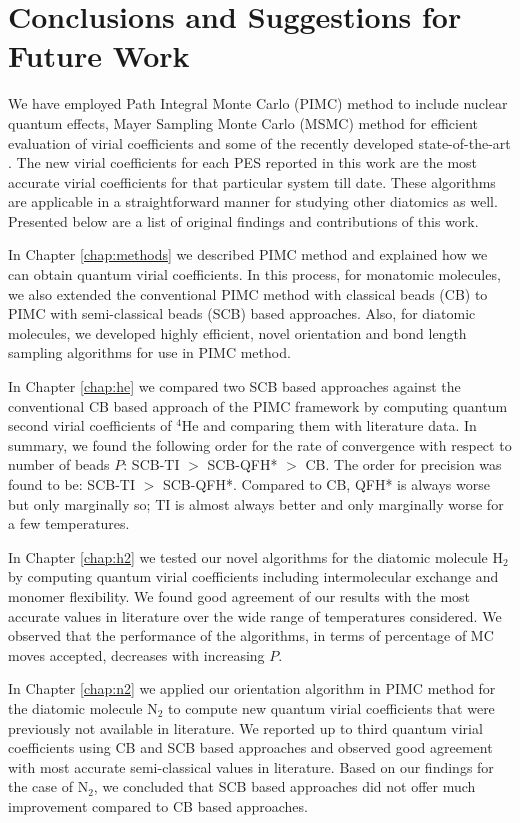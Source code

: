 \chapter{Conclusions and Suggestions for Future Work}
    We have employed Path Integral Monte Carlo (PIMC) method to include nuclear quantum effects, Mayer Sampling Monte Carlo (MSMC) \cite{Singh2004} method for efficient evaluation of virial coefficients and some of the recently developed state-of-the-art \abinitio{} \PESs{}. The new virial coefficients for each \abinitio{} PES reported in this work are the most accurate virial coefficients for that particular system till date. These algorithms are applicable in a straightforward manner for studying other diatomics as well. Presented below are a list of original findings and contributions of this work.

    In Chapter \ref{chap:methods} we described PIMC method and explained how we can obtain quantum virial coefficients. In this process, for monatomic molecules, we also extended the conventional PIMC method with classical beads (CB) to PIMC with semi-classical beads (SCB) based approaches. Also, for diatomic molecules, we developed highly efficient, novel orientation and bond length sampling algorithms for use in PIMC method.

    In Chapter \ref{chap:he} we compared two SCB based approaches against the conventional CB based approach of the PIMC framework by computing quantum second virial coefficients of $^4$He and comparing them with literature data. In summary, we found the following order for the rate of convergence with respect to number of beads $P$: SCB-TI $>$ SCB-QFH* $>$ CB. The order for precision was found to be: SCB-TI $>$ SCB-QFH*. Compared to CB, QFH* is always worse but only marginally so; TI is almost always better and only marginally worse for a few temperatures.

    In Chapter \ref{chap:h2} we tested our novel algorithms for the diatomic molecule H$_2$ by computing quantum virial coefficients including intermolecular exchange and monomer flexibility. We found good agreement of our results with the most accurate values in literature over the wide range of temperatures considered. We observed that the performance of the algorithms, in terms of percentage of MC moves accepted, decreases with increasing $P$.

    In Chapter \ref{chap:n2} we applied our orientation algorithm in PIMC method for the diatomic molecule N$_2$ to compute new quantum virial coefficients that were previously not available in literature. We reported up to third quantum virial coefficients using CB and SCB based approaches and observed good agreement with most accurate semi-classical values in literature. Based on our findings for the case of N$_2$, we concluded that SCB based approaches did not offer much improvement compared to CB based approaches.

